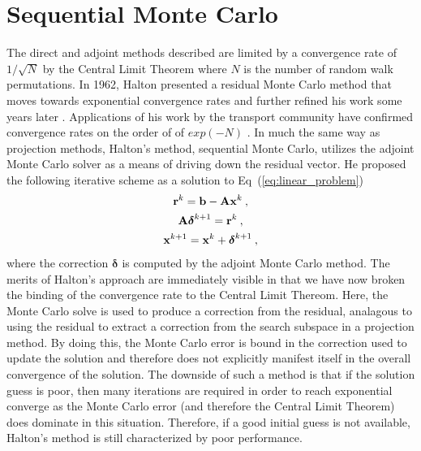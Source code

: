 \section{Sequential Monte Carlo}
\label{sec:sequential_mc}
The direct and adjoint methods described are limited by a convergence
rate of $1/\sqrt{N}$ by the Central Limit Theorem where $N$ is the
number of random walk permutations. In 1962, Halton presented a
residual Monte Carlo method that moves towards exponential convergence
rates \citep{halton_sequential_1962} and further refined his work some
years later \citep{halton_sequential_1994}. Applications of his work
by the transport community have confirmed convergence rates on the
order of of $exp(-N)$
\citep{evans_residual_2003}. In
much the same way as projection methods, Halton's method, sequential
Monte Carlo, utilizes the adjoint Monte Carlo solver as a means of
driving down the residual vector. He proposed the following iterative
scheme as a solution to Eq~(\ref{eq:linear_problem})\:
\begin{subequations}
  \begin{gather}
    \mathbf{r}^k = \mathbf{b} - \mathbf{A}\mathbf{x}^k\:,\\  
    \mathbf{A}\boldsymbol{\delta}^{k+1} = \mathbf{r}^{k}\:,\\
    \mathbf{x}^{k+1} = \mathbf{x}^k + \boldsymbol{\delta}^{k+1}\:,
  \end{gather}
  \label{eq:sequential_monte_carlo}
\end{subequations}
where the correction $\boldsymbol{\delta}$ is computed by the adjoint
Monte Carlo method. The merits of Halton's approach are immediately
visible in that we have now broken the binding of the convergence rate
to the Central Limit Thereom. Here, the Monte Carlo solve is used to
produce a correction from the residual, analagous to using the
residual to extract a correction from the search subspace in a
projection method. By doing this, the Monte Carlo error is bound in
the correction used to update the solution and therefore does not
explicitly manifest itself in the overall convergence of the
solution. The downside of such a method is that if the solution guess
is poor, then many iterations are required in order to reach
exponential converge as the Monte Carlo error (and therefore the
Central Limit Theorem) does dominate in this situation. Therefore, if
a good initial guess is not available, Halton's method is still
characterized by poor performance.

